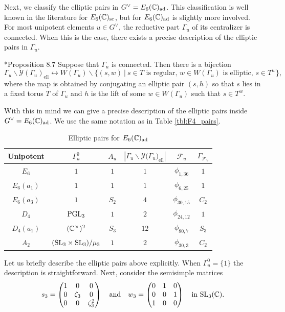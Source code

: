 Next, we classify the elliptic pairs in $G^\vee=E_6(\mathbb{C})_{\mathrm{ad}}$. This classification is well known in the literature for $E_6(\mathbb{C})_{\mathrm{sc}}$, but for $E_6(\mathbb{C})_{\mathrm{ad}}$ is slightly more involved. For most unipotent elements $u\in G^\vee$, the reductive part $\Gamma_u$ of its centralizer is connected. When this is the case, there exists a precise description of the elliptic pairs in $\Gamma_u$.

\begin{proposition}\cite{AubertCiubotaruRomano2024}*{Proposition 8.7}
    Suppose that $\Gamma_u$ is connected. Then there is a bijection
    $$\Gamma_u\backslash\mathcal{Y}(\Gamma_u)_{\textrm{ell}}\leftrightarrow W(\Gamma_u)\backslash\{(s,w)\ |\ s\in T\text{ is regular, } w\in W(\Gamma_u)\text{ is elliptic, }s\in T^w\},$$
    where the map is obtained by conjugating an elliptic pair $(s,h)$ so that $s$ lies in a fixed torus $T$ of $\Gamma_u$ and $h$ is the lift of some $w\in W(\Gamma_u)$ such that $s\in T^w$.
\end{proposition}

With this in mind we can give a precise description of the elliptic pairs inside $G^\vee=E_6(\mathbb{C})_{\mathrm{ad}}$. We use the same notation as in Table \ref{tbl:F4_pairs}.

\begin{table}[ht]
    \centering
    \begin{tabular}{|c|c|c|c|c|c|}
        \hline
        Unipotent & $\Gamma_u^0$ & $A_u$ & $|\Gamma_u\backslash\mathcal{Y}\mathcal(\Gamma_u)_{\text{ell}}|$ & $\mathcal{F}_{u}$ & $\Gamma_{\mathcal{F}_u}$ \\\hline
        $E_6$ & $1$ & $1$ & $1$ & $\phi_{1,36}$ & $1$ \\\hline
        $E_6(a_1)$ & $1$ & $1$ & $1$ & $\phi_{6,25}$ & $1$ \\\hline
        $E_6(a_3)$ & $1$ & $S_2$ & $4$ & $\phi_{30,15}$ & $C_2$ \\\hline
        $D_4$ & $\mathrm{PGL}_3$ & $1$ & $2$ & $\phi_{24,12}$ & $1$ \\\hline
        $D_4(a_1)$ & $(\mathbb{C}^\times)^2$ & $S_3$ & $12$ & $\phi_{80,7}$ & $S_3$ \\\hline
        $A_2$ & $(\mathrm{SL}_3\times\mathrm{SL}_3)/\mu_3$ & $1$ & $2$ & $\phi_{30,3}$ & $C_2$\\\hline
    \end{tabular}
    \caption{Elliptic pairs for $E_6(\mathbb{C})_{\mathrm{ad}}$}
    \label{tbl:E6_pairs}
\end{table}

Let us briefly describe the elliptic pairs above explicitly. When $\Gamma_u^0=\{1\}$ the description is straightforward. Next, consider the semisimple matrices 
$$s_3=\begin{pmatrix}
    1 & 0 & 0 \\
    0 & \zeta_3 & 0 \\
    0 & 0 & \zeta_3^2 
\end{pmatrix}\quad\text{and}\quad w_3=\begin{pmatrix}
    0 & 1 & 0\\
    0 & 0 & 1\\
    1 & 0 & 0
\end{pmatrix}\quad\text{in }\mathrm{SL}_3(\mathbb{C}).$$

